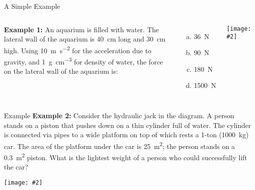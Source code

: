\documentclass[12pt,aspectratio=169]{beamer}
\newcommand{\pic}[2]{\texttt{[image: \#2]}}
\begin{document}
\begin{frame}{A Simple Example}
  \begin{columns}

    \textbf{Example 1:} An aquarium is filled with water. The lateral wall of
    the aquarium is \SI{40}{\centi\metre} long and \SI{30}{\centi\metre} high.
    Using \SI{10}{\metre\per\second^2} for the acceleration due to gravity,
    and \SI{1}{\gram\per\centi\metre^3} for density of water, the force on the
    lateral wall of the aquarium is:
    \begin{enumerate}[(a)]
    \item\SI{36}{\newton}
    \item\SI{90}{\newton}
    \item\SI{180}{\newton}
    \item\SI{1500}{\newton}
    \end{enumerate}

    \pic{1}{home-fish-tank.jpg}
  \end{columns}
\end{frame}



\begin{frame}{Example}
  \textbf{Example 2:} Consider the hydraulic jack in the diagram. A person
  stands on a piston that pushes down on a thin cylinder full of water. The
  cylinder is connected via pipes to a wide platform on top of which rests a
  1-ton (\SI{1000}{\kilo\gram}) car. The area of the platform under the car is
  \SI{25}{\metre^2}; the person stands on a \SI{.3}{\metre^2} piston. What is
  the lightest weight of a person who could successfully lift the car?
  \begin{center}
    \vspace{-.2in}
    \pic{.35}{jack.png}
    
  \end{center}
\end{frame}
\end{document}
